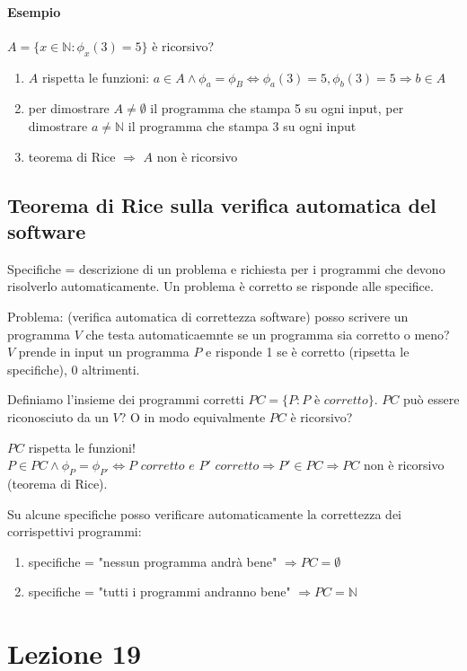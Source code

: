 \documentclass{article}
\begin{document}
\paragraph{Esempio} $A=\{ x \in \mathbb{N}: \phi_x(3)=5 \}$ è ricorsivo?
\begin{enumerate}
	\item $A$ rispetta le funzioni: $a \in A \land \phi_a=\phi_B \Leftrightarrow \phi_a(3)=5, \phi_b(3)=5 \Rightarrow b \in A$
	\item per dimostrare $A \neq \emptyset$ il programma che stampa 5 su ogni input, per dimostrare $a \neq \mathbb{N}$ il programma che stampa 3 su ogni input
	\item teorema di Rice $\Rightarrow$ $A$ non è ricorsivo 
\end{enumerate}


\subsection{Teorema di Rice sulla verifica automatica del software}
Specifiche = descrizione di un problema e richiesta per i programmi che devono risolverlo automaticamente. Un problema è corretto se risponde alle specifice.



Problema: (verifica automatica di correttezza software) posso scrivere un programma $V$ che testa automaticaemnte se un programma sia corretto o meno? $V$ prende in input un programma $P$ e risponde 1 se è corretto (ripsetta le specifiche), 0 altrimenti.




Definiamo l'insieme dei programmi corretti $PC=\{ P:P \textit{ è corretto} \}$. $PC$ può essere riconosciuto da un $V$? O in modo equivalmente $PC$ è ricorsivo?




$PC$ rispetta le funzioni! $P \in PC \land \phi_P=\phi_{P'} \Leftrightarrow P \textit{ corretto e } P' \textit{ corretto} \Rightarrow P' \in PC \Rightarrow PC$ non è ricorsivo (teorema di Rice).




Su alcune specifiche posso verificare automaticamente la correttezza dei corrispettivi programmi:
\begin{enumerate}
	\item specifiche = "nessun programma andrà bene" $\Rightarrow PC = \emptyset$
	\item specifiche = "tutti i programmi andranno bene" $\Rightarrow PC = \mathbb{N}$
\end{enumerate}


\section{Lezione 19}
\end{document}
